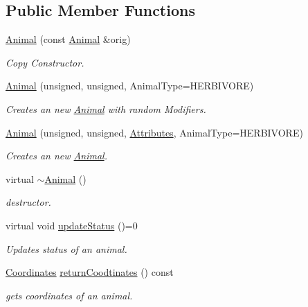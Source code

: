 \subsection*{Public Member Functions}
\begin{DoxyCompactItemize}
\item 
\hyperlink{class_animal_ab26f5f62b5194201e0b07729bde2f5dc}{Animal} (const \hyperlink{class_animal}{Animal} \&orig)
\begin{DoxyCompactList}\small\item\em Copy Constructor. \end{DoxyCompactList}\item 
\hyperlink{class_animal_af84c9e041ddd20710ef3412d415e68a8}{Animal} (unsigned, unsigned, Animal\+Type=H\+E\+R\+B\+I\+V\+O\+R\+E)
\begin{DoxyCompactList}\small\item\em Creates an new \hyperlink{class_animal}{Animal} with random Modifiers. \end{DoxyCompactList}\item 
\hyperlink{class_animal_a232b2b3551f7161e100fd1b508accbcd}{Animal} (unsigned, unsigned, \hyperlink{class_attributes}{Attributes}, Animal\+Type=H\+E\+R\+B\+I\+V\+O\+R\+E)
\begin{DoxyCompactList}\small\item\em Creates an new \hyperlink{class_animal}{Animal}. \end{DoxyCompactList}\item 
virtual \hyperlink{class_animal_a476af25adde5f0dfa688129c8f86fa5c}{$\sim$\+Animal} ()
\begin{DoxyCompactList}\small\item\em destructor. \end{DoxyCompactList}\item 
virtual void \hyperlink{class_animal_acd9cdd1e77d0e1c54b2601aa52865b90}{update\+Status} ()=0
\begin{DoxyCompactList}\small\item\em Updates status of an animal. \end{DoxyCompactList}\item 
\hyperlink{struct_coordinates}{Coordinates} \hyperlink{class_animal_aacc92184b295e2599bfe4143c107b1c0}{return\+Coodtinates} () const 
\begin{DoxyCompactList}\small\item\em gets coordinates of an animal. \end{DoxyCompactList}\item 

\end{DoxyCompactItemize}
